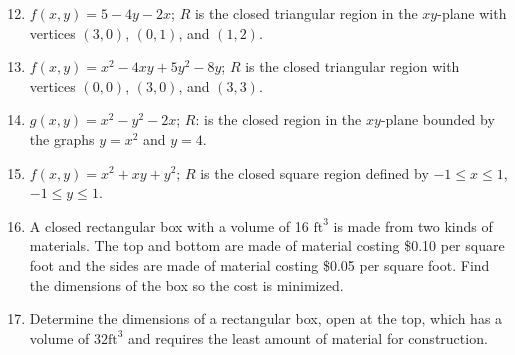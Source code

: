 \documentclass[12pt]{article}
\newif\ifans
\begin{document}
\begin{enumerate}
\setcounter{enumi}{11}

\item $f(x,y)=5-4y-2x$; $R$ is the closed triangular region in the $xy$-plane with vertices $(3,0)$, $(0,1)$, and $(1,2)$. 

\ifans{\fbox{Absolute minimum of $-5$ at $(1,2)$; Absolute maximum of $1$ at $(0,1)$}} \fi

\item $f(x,y)=x^2-4xy+5y^2-8y$; $R$ is the closed triangular region with vertices $(0,0)$, $(3,0)$, and $(3,3)$.

\ifans{\fbox{Absolute minimum of $-11$ at $(3,2)$; Absolute maximum of 9 at $(3,0)$}} \fi

\item $g(x,y)=x^2-y^2-2x$; $R$: is the closed region in the $xy$-plane bounded by the graphs $y=x^2$ and $y=4$. 

\ifans{\fbox{\parbox{0.9\linewidth}{Absolute minimum of $-17$ at $(1,4)$; Absolute maximum of $2$ at $(-1,1)$; 
\\Detailed Solution: \textcolor{blue}{\href{http://www.math.drexel.edu/classes/Calculus/resources/Math200HW/Solutions/15_200_Extrema_14.pdf}{Here}}}} }\fi

\item $f(x,y)=x^2+xy+y^2$; $R$ is the closed square region defined by $-1 \leq x \leq 1$, $-1 \leq y \leq 1$.

\ifans{\fbox{Absolute minimum of 0 at $(0,0)$; Absolute maximum of 3 at $(1,1)$ and $(-1,-1)$}} \fi

\item A closed rectangular box with a volume of 16 $\text{ft}^3$ is made from two kinds of materials.  The top and bottom are made of material costing \$0.10 per square foot and the sides are made of material costing \$0.05 per square foot.  Find the dimensions of the box so the cost is minimized.

\ifans{\fbox{$2\text{ft} \times 2\text{ft} \times 4\text{ft}$; Detailed Solution: \textcolor{blue}{\href{http://www.math.drexel.edu/classes/Calculus/resources/Math200HW/Solutions/15_200_Extrema_16.pdf}{Here}}}} \fi

\item Determine the dimensions of a rectangular box, open at the top, which has  a volume of $32 \text{ft}^3$ and requires the least amount of material for construction.

\ifans{\fbox{$4 \text{ft}\times 4\text{ft} \times 2 \text{ft}$}} \fi


\end{enumerate}
\end{document}
